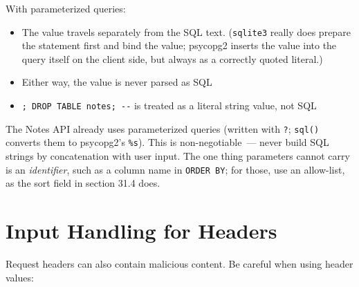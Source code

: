 \noindent{}With parameterized queries:

\begin{itemize}
\tightlist
\item
  The value travels separately from the SQL text. (\texttt{sqlite3} really does prepare the statement first and bind the value; psycopg2 inserts the value into the query itself on the client side, but always as a correctly quoted literal.)
\item
  Either way, the value is never parsed as SQL
\item
  \texttt{\textquotesingle{};\ DROP\ TABLE\ notes;\ -\/-} is treated as a literal string value, not SQL
\end{itemize}

\noindent{}The Notes API already uses parameterized queries (written with \texttt{?}; \texttt{sql()} converts them to psycopg2's \texttt{\%s}). This is non-negotiable~--- never build SQL strings by concatenation with user input. The one thing parameters cannot carry is an \emph{identifier}, such as a column name in \texttt{ORDER\ BY}; for those, use an allow-list, as the sort field in section 31.4 does.

\setcounter{section}{5}
\section{Input Handling for Headers}\label{31-input-handling:316-input-handling-for-headers}

Request headers can also contain malicious content. Be careful when using header values:

\begin{codebox}[short]

\begin{Shaded}
\begin{Highlighting}[]
\OperatorTok{=}\NormalTok{, }\NormalTok{)}


\end{Highlighting}
\end{Shaded}

\end{codebox}

